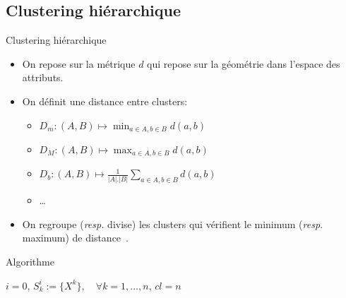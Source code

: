 \documentclass[8pt]{beamer}
\begin{document}
		\subsection{Clustering hiérarchique}
			\begin{frame}{Clustering hiérarchique}
				\begin{itemize}
					\item<1-> On repose sur la métrique \(d\) qui repose sur la géométrie dans l'espace des attributs.
					\item<2-> On définit une distance entre clusters:
						\begin{itemize}
							\item<3-> \(D_m: (A, B) \mapsto \min_{a\in A, b\in B} d(a,b)\)
							\item<4-> \(D_M: (A, B) \mapsto \max_{a\in A, b\in B} d(a,b)\)
							\item<5-> \(D_b: (A, B) \mapsto \frac{1}{\vert A \vert.\vert B \vert}\sum_{a\in A, b\in B} d(a,b)\)
							\item<6-> \dots
						\end{itemize}
					\item<7-> On regroupe (\textit{resp.} divise) les clusters qui vérifient le minimum (\textit{resp.} maximum) de distance~\cite{hastie2009unsupervised,ward1963hierarchical}.
				\end{itemize}
			\end{frame}
			\begin{frame}{Algorithme}
				\begin{algorithm}[H]
					
					\(i = 0\), \(S^i_k:=\{X^k\}, \quad \forall k = 1,\dots,n\), \(cl=n\)\;
				\end{algorithm}
			\end{frame}
\end{document}
